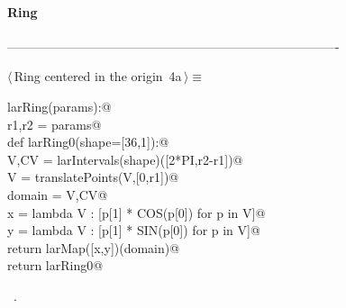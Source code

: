 \documentclass[11pt,oneside]{article}	%
\begin{document}
\paragraph{Ring}
-------------------------------------------------------------------------------
\begin{flushleft} \small \label{scrap8}
\protect{}$\langle\,$Ring centered in the origin\nobreak\ {\footnotesize 4a}$\,\rangle\equiv$
\vspace{-1ex}
\begin{list}{}{} \item
\mbox{}\verb@def larRing(params):@\\
\mbox{}\verb@   r1,r2 = params@\\
\mbox{}\verb@   def larRing0(shape=[36,1]):@\\
\mbox{}\verb@      V,CV = larIntervals(shape)([2*PI,r2-r1])@\\
\mbox{}\verb@      V = translatePoints(V,[0,r1])@\\
\mbox{}\verb@      domain = V,CV@\\
\mbox{}\verb@      x = lambda V : [p[1] * COS(p[0]) for p in V]@\\
\mbox{}\verb@      y = lambda V : [p[1] * SIN(p[0]) for p in V]@\\
\mbox{}\verb@      return larMap([x,y])(domain)@\\
\mbox{}\verb@   return larRing0@\\
\mbox{}\verb@@{\NWsep}
\end{list}
\vspace{-1ex}
\footnotesize\addtolength{\baselineskip}{-1ex}
\begin{list}{}{\setlength{\itemsep}{-\parsep}\setlength{\itemindent}{-\leftmargin}}
\item \NWtxtMacroRefIn\ .
\end{list}
\end{flushleft}
\end{document}
